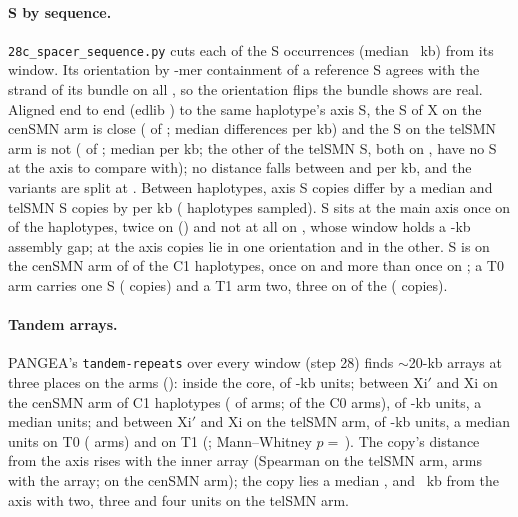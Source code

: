 \paragraph{S by sequence.} \texttt{28c\_spacer\_sequence.py} cuts each of the \sOcc{} S occurrences (median
\sLen~kb) from its window. Its orientation by \sK-mer containment of a reference S agrees with the strand of its
bundle on all \sOrientAgree, so the orientation flips the bundle shows are real. Aligned end to end (edlib \verEdlib) to
the same haplotype's axis S, the S of X on the cenSMN arm is close (\sCenSa{} of \sCenAll; median \sSaMed{}
differences per kb) and the S on the telSMN arm is not (\sTelSt{} of \sTelAll; median \sStMed{} per kb; the other \sTelUntyped{} of the \sTelOcc{} telSMN S, both on \sNoAxisHap, have no S at the axis to compare with); no distance
falls between \sGapLo{} and \sGapHi{} per kb, and the variants are split at \sCut. Between haplotypes, axis S copies differ by a median
\sAxisBetween{} and telSMN S copies by \sTelBetween{} per kb (\sSample{} haplotypes sampled). S sits at the main axis once on \elAxisS{} of the \elHaps{} haplotypes, twice on \sAxisTwo{} (\sAxisTwoHaps) and not at all on \sAxisNoneHaps, whose window holds a \gapNoAxisKb-kb assembly gap; at the axis \sAxisFwd{} copies lie in one orientation and \sAxisRev{} in the other. S is on the cenSMN arm of \sCenHaps{} of the \elCOne{} C1 haplotypes, once on \sCenOnce{} and more than once on \sCenMore; a T0 arm carries one S (\sTelTzeroN{} copies) and a T1 arm two, three on \sTelToneThree{} of the \sTelToneArms{} (\sTelToneN{} copies).

\paragraph{Tandem arrays.} PANGEA's \texttt{tandem-repeats} over every window (step 28) finds $\sim$20-kb arrays at
three places on the arms (): inside the core, of \elInnerUnit-kb units; between Xi$'$ and Xi
on the cenSMN arm of C1 haplotypes (\elOutCOne{} of \elCOne{} arms; \elOutCZero{} of the C0 arms), of
\elOutCUnit-kb units, a median \elOutCCopies{} units; and between Xi$'$ and Xi on the telSMN arm, of \elOutTUnit-kb units, a
median \elOutTZeroCopies{} units on T0 (\elOutTZero{} arms) and \elOutTOneCopies{} on T1 (\elOutTOne{}; Mann--Whitney
$p=$\,\elOutTP). The copy's distance from the axis rises with the inner array (Spearman \elRhotel{} on the telSMN arm,
\elNInnertel{} arms with the array; \elRhocen{} on the cenSMN arm); the copy lies a median \elCopyAtInnerTwo, \elCopyAtInnerThree{} and \elCopyAtInnerFour~kb from the axis with two, three and four units on the telSMN arm.

